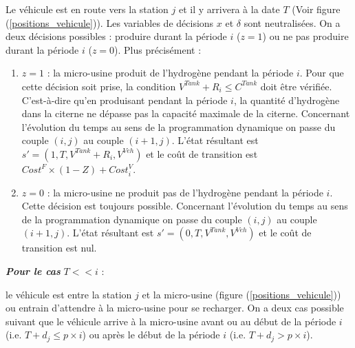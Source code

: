 Le véhicule est en route vers la station $j$ et il y arrivera à la date $T$ (Voir figure (\ref{positions_vehicule})). Les variables de décisions $x$ et $\delta$ sont neutralisées. On a deux décisions possibles : produire durant la période $i$ ($z=1$) ou ne pas produire durant la période $i$ ($z=0$). Plus précisément :
\begin{enumerate}[label=\arabic*)]
	\item $z=1$ : la micro-usine produit de l'hydrogène pendant la période $i$. Pour que cette décision soit prise, la condition $V^{Tank} + R_i \leq C^{Tank}$ doit être vérifiée. C'est-à-dire qu'en produisant pendant la période $i$, la quantité d'hydrogène dans la citerne ne dépasse pas la capacité maximale de la citerne. Concernant l'évolution du temps au sens de la programmation dynamique on passe du couple $(i,j)$ au couple $(i+1,j)$. L'état résultant est $s'=(1, T,V^{Tank} + R_i, V^{Veh} )$ et le coût de transition est $Cost^F \times (1-Z) + Cost_i^V$.
	
	\item $z=0$ : la micro-usine ne produit pas de l'hydrogène pendant la période $i$. Cette décision est toujours possible. Concernant l'évolution du temps au sens de la programmation dynamique on passe du couple $(i,j)$ au couple $(i+1,j)$. L'état résultant est $s'=(0,T, V^{Tank},V^{Veh})$ et le coût de transition est nul.
\end{enumerate}



\textit{\textbf{Pour le cas}} $T<<i$ :

le véhicule est entre la station $j$ et la micro-usine (figure (\ref{positions_vehicule})) ou entrain d'attendre à la micro-usine pour se recharger. On a deux cas possible suivant que le véhicule arrive à la micro-usine avant ou au début de la période $i$ (i.e. $T+d_j\leq p\times i$) ou après le début de la période $i$ (i.e. $T+d_j>p\times i$).

